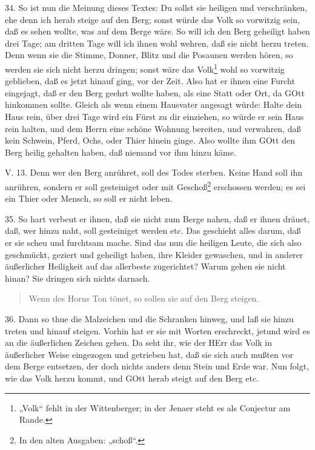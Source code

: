 34. So ist nun die Meinung dieses Textes: Du sollst sie heiligen und verschränken, ehe denn ich herab steige auf den Berg; sonst würde das Volk so vorwitzig sein, daß es sehen wollte, was auf dem Berge wäre. So will ich den Berg geheiligt haben drei Tage; am dritten Tage will ich ihnen wohl wehren, daß sie nicht herzu treten. Denn wenn sie die Stimme, Donner, Blitz und die Posaunen werden hören, so werden sie sich nicht herzu dringen; sonst wäre das Volk\footnote{„Volk“ fehlt in der Wittenberger; in der Jenaer steht es als Conjectur am Rande.} wohl so vorwitzig geblieben, daß es jetzt hinauf ging, vor der Zeit. Also hat er ihnen eine Furcht eingejagt, daß er den Berg geehrt wollte haben, als eine Statt oder Ort, da GOtt hinkommen sollte. Gleich als wenn einem Hausvater angesagt würde: Halte dein Haus rein, über drei Tage wird ein Fürst zu dir einziehen, so würde er sein Haus rein halten, und dem Herrn eine schöne Wohnung bereiten, und verwahren, daß kein Schwein, Pferd, Ochs, oder Thier hinein ginge. Also wollte ihm GOtt den Berg heilig gehalten haben, daß niemand vor ihm hinzu käme.

\begin{schriftzitat}
V. 13. Denn wer den Berg anrühret, soll des Todes sterben. Keine Hand soll ihn anrühren, sondern er soll gesteiniget oder mit Geschoß\footnote{In den alten Ausgaben: „schoß“.} erschossen werden; es sei ein Thier oder Mensch, so soll er nicht leben.
\end{schriftzitat}

35. So hart verbeut er ihnen, daß sie nicht zum Berge nahen, daß er ihnen dräuet, daß, wer hinzu naht, soll gesteiniget werden etc. Das geschieht alles darum, daß er sie scheu und furchtsam mache. Sind das nun die heiligen Leute, die sich also geschmückt, geziert und geheiligt haben, ihre Kleider gewaschen, und in anderer äußerlicher Heiligkeit auf das allerbeste zugerichtet? Warum gehen sie nicht hinan? Sie dringen sich nichts darnach.

\begin{quote}
Wenn des Horns Ton tönet, so sollen sie auf den Berg steigen.
\end{quote}

36. Dann so thue die Malzeichen und die Schranken hinweg, und laß sie hinzu treten und hinauf steigen. Vorhin hat er sie mit Worten erschreckt, jetund wird es an die äußerlichen Zeichen gehen. Da seht ihr, wie der HErr das Volk in äußerlicher Weise eingezogen und getrieben hat, daß sie sich auch mußten vor dem Berge entsetzen, der doch nichts anders denn Stein und Erde war. Nun folgt, wie das Volk herzu kommt, und GOtt herab steigt auf den Berg etc.


